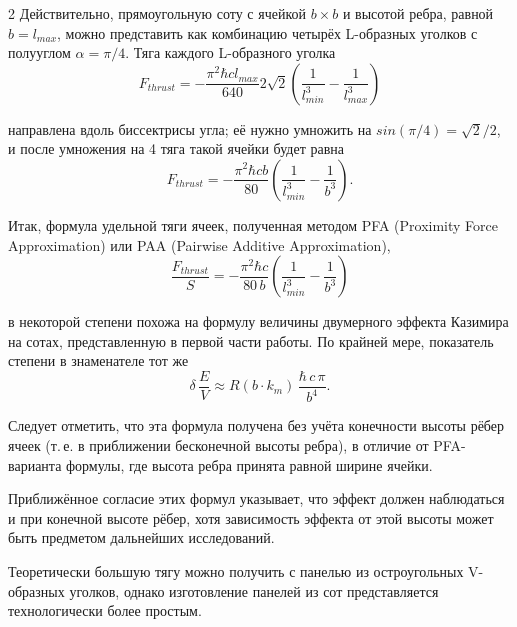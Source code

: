 \documentclass[twoside, 10pt]{article}
\begin{document}
\begin{multicols}{2}
Действительно, прямоугольную соту с ячейкой \(b \times b\) и высотой ребра, равной \(b = l_{max}\), можно представить как комбинацию четырёх \mbox{L-образных} уголков с полууглом \(\alpha = {\pi}/{4}\). Тяга каждого \mbox{L-образного} уголка
\noindent
\begin{equation}F_{thrust} = - \frac{\pi^2\hbar c l_{max}}{640} 2\sqrt{2} \left(\frac{1}{l_{min}^3} - \frac{1}{l_{max}^3}\right)\end{equation}

направлена вдоль биссектрисы угла; её нужно умножить на
\(sin\left({\pi}/{4}\right)={\sqrt{2}}\big/{2}\), и после умножения
на 4 тяга такой ячейки будет равна
\noindent
\begin{equation}F_{thrust} = - \frac{\pi^2\hbar c b}{80} \left(\frac{1}{l_{min}^3} - \frac{1}{b^3}\right).\end{equation}

Итак, формула удельной тяги ячеек, полученная методом PFA (Proximity Force Approximation) или PAA (Pairwise Additive Approximation),
\noindent
\begin{equation}\frac{F_{thrust}}{S} = - \frac{\pi^2\hbar c}{80\, b} \left(\frac{1}{l_{min}^3} - \frac{1}{b^3}\right)\end{equation}

в некоторой степени похожа на формулу величины двумерного эффекта Казимира на сотах, представленную в первой части работы. По крайней мере, показатель степени в знаменателе тот же
\noindent
\begin{equation}\delta\,\frac{E}{V} \approx R\left(b \cdot k_m\right)\,\frac{\hbar\,c\,\pi}{b^4}.\end{equation}

Следует отметить, что эта формула получена без учёта конечности высоты рёбер ячеек (т.\,е. в приближении бесконечной высоты ребра), в отличие от PFA-варианта формулы, где высота ребра принята равной ширине ячейки.

Приближённое согласие этих формул указывает, что эффект должен наблюдаться и при конечной высоте рёбер, хотя зависимость эффекта от этой высоты может быть предметом дальнейших исследований.

Теоретически большую тягу можно получить с панелью из остроугольных \mbox{V-образных} уголков, однако изготовление панелей из сот представляется технологически более простым.


\end{multicols}
\end{document}

